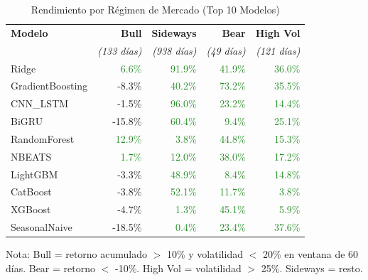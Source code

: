 \begin{table}[htbp]
\centering
\caption{Rendimiento por R\'egimen de Mercado (Top 10 Modelos)}
\label{tab:regime_performance}
\small
\begin{tabular}{@{}lrrrr@{}}
\toprule
\textbf{Modelo} & \textbf{Bull} & \textbf{Sideways} & \textbf{Bear} & \textbf{High Vol} \\
 & \textit{(133 d\'ias)} & \textit{(938 d\'ias)} & \textit{(49 d\'ias)} & \textit{(121 d\'ias)} \\
\midrule
Ridge & \textcolor{ForestGreen}{6.6\%} & \textcolor{ForestGreen}{91.9\%} & \textcolor{ForestGreen}{41.9\%} & \textcolor{ForestGreen}{36.0\%} \\
GradientBoosting & \textcolor{BrickRed}{-8.3\%} & \textcolor{ForestGreen}{40.2\%} & \textcolor{ForestGreen}{73.2\%} & \textcolor{ForestGreen}{35.5\%} \\
CNN\_LSTM & \textcolor{BrickRed}{-1.5\%} & \textcolor{ForestGreen}{96.0\%} & \textcolor{ForestGreen}{23.2\%} & \textcolor{ForestGreen}{14.4\%} \\
BiGRU & \textcolor{BrickRed}{-15.8\%} & \textcolor{ForestGreen}{60.4\%} & \textcolor{ForestGreen}{9.4\%} & \textcolor{ForestGreen}{25.1\%} \\
RandomForest & \textcolor{ForestGreen}{12.9\%} & \textcolor{ForestGreen}{3.8\%} & \textcolor{ForestGreen}{44.8\%} & \textcolor{ForestGreen}{15.3\%} \\
NBEATS & \textcolor{ForestGreen}{1.7\%} & \textcolor{ForestGreen}{12.0\%} & \textcolor{ForestGreen}{38.0\%} & \textcolor{ForestGreen}{17.2\%} \\
LightGBM & \textcolor{BrickRed}{-3.3\%} & \textcolor{ForestGreen}{48.9\%} & \textcolor{ForestGreen}{8.4\%} & \textcolor{ForestGreen}{14.8\%} \\
CatBoost & \textcolor{BrickRed}{-3.8\%} & \textcolor{ForestGreen}{52.1\%} & \textcolor{ForestGreen}{11.7\%} & \textcolor{ForestGreen}{3.8\%} \\
XGBoost & \textcolor{BrickRed}{-4.7\%} & \textcolor{ForestGreen}{1.3\%} & \textcolor{ForestGreen}{45.1\%} & \textcolor{ForestGreen}{5.9\%} \\
SeasonalNaive & \textcolor{BrickRed}{-18.5\%} & \textcolor{ForestGreen}{0.4\%} & \textcolor{ForestGreen}{23.4\%} & \textcolor{ForestGreen}{37.6\%} \\
\bottomrule
\end{tabular}
\begin{tablenotes}
\small
\item Nota: Bull = retorno acumulado $>$ 10\% y volatilidad $<$ 20\% en ventana de 60 d\'ias. Bear = retorno $<$ -10\%. High Vol = volatilidad $>$ 25\%. Sideways = resto.
\end{tablenotes}
\end{table}
